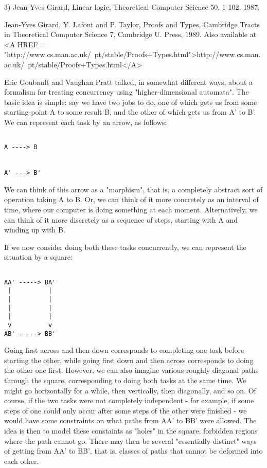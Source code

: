 3) Jean-Yves Girard, Linear logic, Theoretical Computer Science 50,
1-102, 1987.

Jean-Yves Girard, Y. Lafont and P. Taylor, Proofs and Types, Cambridge
Tracts in Theoretical Computer Science 7, Cambridge U. Press, 1989.
Also available at <A HREF = "http://www.cs.man.ac.uk/~pt/stable/Proofs+Types.html">http://www.cs.man.ac.uk/~pt/stable/Proofs+Types.html</A>

Eric Goubault and Vaughan Pratt talked, in somewhat different ways,
about a formalism for treating concurrency using "higher-dimensional
automata".  The basic idea is simple: say we have two jobs to do, one of
which gets us from some starting-point A to some result B, and the other
of which gets us from A' to B'.  We can represent each task by an arrow,
as follows:


\begin{verbatim}

A ----> B


A' ---> B'
\end{verbatim}
    

We can think of this arrow as a "morphism", that is, a completely abstract
sort of operation taking A to B.  Or, we can think of it more concretely
as an interval of time, where our computer is doing something at each
moment.  Alternatively, we can think of it more discretely as a sequence
of steps, starting with A and winding up with B.  

If we now consider doing both these tasks concurrently, we can represent the
situation by a square:


\begin{verbatim}

AA' -----> BA'
 |          |
 |          |
 |          |
 |          |
 v          v
AB' -----> BB'
\end{verbatim}
    

Going first across and then down corresponds to completing one task
before starting the other, while going first down and then across
corresponds to doing the other one first.  However, we can also imagine
various roughly diagonal paths through the square, corresponding to
doing both tasks at the same time.  We might go horizontally for a
while, then vertically, then diagonally, and so on.  Of course, if the
two tasks were not completely independent - for example, if some steps
of one could only occur after some steps of the other were finished -
we would have some constraints on what paths from AA' to BB' were
allowed.  The idea is then to model these constaints as "holes" in the
square, forbidden regions where the path cannot go.  There may then be
several "essentially distinct" ways of getting from AA' to BB', that is,
classes of paths that cannot be deformed into each other.  


